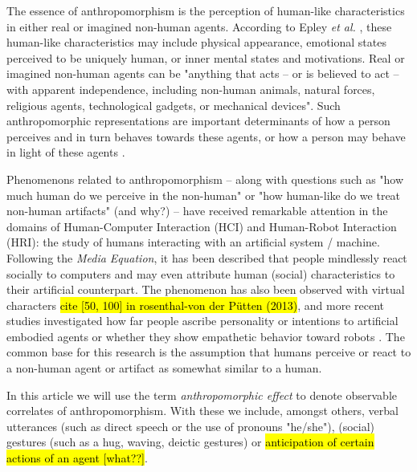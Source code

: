 \documentclass{frontiersSCNS} %
\begin{document}
The essence of anthropomorphism is the perception of human-like characteristics
in either real or imagined non-human agents. According to Epley \textit{et al.}
\cite{epley_when_2008}, these human-like characteristics may include physical
appearance, emotional states perceived to be uniquely human, or inner mental
states and motivations. Real or imagined non-human agents can be "anything that
acts -- or is believed to act -- with apparent independence, including non-human
animals, natural forces, religious agents, technological gadgets, or mechanical
devices". Such anthropomorphic representations are important determinants of how
a person perceives and in turn behaves towards these agents, or how a person may
behave in light of these agents \cite{epley_when_2008}.

	
Phenomenons related to anthropomorphism -- along with questions such as "how
much human do we perceive in the non-human" or "how human-like do we treat
non-human artifacts" (and why?) -- have received remarkable attention in the
domains of Human-Computer Interaction (HCI) and Human-Robot Interaction (HRI):
the study of humans interacting with an artificial system / machine. Following
the \textit{Media Equation}, it has been described that people mindlessly react
socially to computers \cite{reeves_media_1996} and may even attribute human
(social) characteristics to their artificial counterpart. The phenomenon has
also been observed with virtual characters \hl{cite [50, 100] in rosenthal-von
der P{\"u}tten (2013)}, and more recent studies investigated how far people
ascribe personality or intentions to artificial embodied agents or whether they
show empathetic behavior toward robots
\cite{rosenthal-vonderputten_experimental_2013}. The common base for this
research is the assumption that humans perceive or react to a non-human agent or
artifact as somewhat similar to a human.

In this article we will use the term \emph{anthropomorphic effect} to denote
observable correlates of anthropomorphism. With these we include, amongst
others, verbal utterances (such as direct speech or the use of pronouns
"he/she"), (social) gestures (such as a hug, waving, deictic gestures) or
\hl{anticipation of certain actions of an agent [what??]}.

\end{document}
